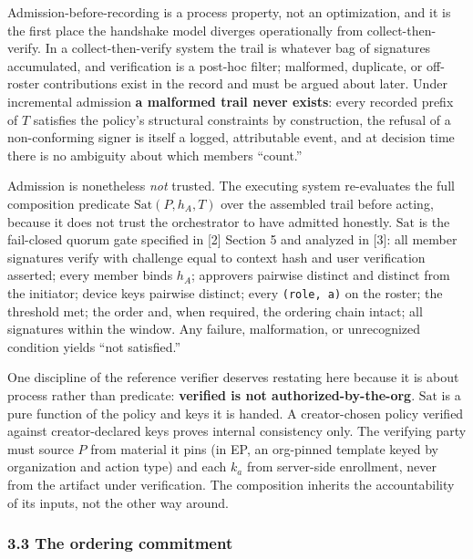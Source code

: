 \documentclass[
  11pt,
]{article}
\begin{document}
Admission-before-recording is a process property, not an optimization,
and it is the first place the handshake model diverges operationally
from collect-then-verify. In a collect-then-verify system the trail is
whatever bag of signatures accumulated, and verification is a post-hoc
filter; malformed, duplicate, or off-roster contributions exist in the
record and must be argued about later. Under incremental admission
\textbf{a malformed trail never exists}: every recorded prefix of $T$
satisfies the policy's structural constraints by construction, the
refusal of a non-conforming signer is itself a logged, attributable
event, and at decision time there is no ambiguity about which members
``count.''

Admission is nonetheless \emph{not} trusted. The executing system
re-evaluates the full composition predicate $\mathrm{Sat}(P, h_A, T)$
over the assembled trail before acting, because it does not trust the
orchestrator to have admitted honestly. $\mathrm{Sat}$ is the
fail-closed quorum gate specified in {[}2{]} Section 5 and analyzed in
{[}3{]}: all member signatures verify with challenge equal to context
hash and user verification asserted; every member binds $h_A$;
approvers pairwise distinct and distinct from the initiator; device keys
pairwise distinct; every \texttt{(role,\ a)} on the roster; the
threshold met; the order and, when required, the ordering chain intact;
all signatures within the window. Any failure, malformation, or
unrecognized condition yields ``not satisfied.''

One discipline of the reference verifier deserves restating here because
it is about process rather than predicate: \textbf{verified is not
authorized-by-the-org}. $\mathrm{Sat}$ is a pure function of the policy
and keys it is handed. A creator-chosen policy verified against
creator-declared keys proves internal consistency only. The verifying
party must source $P$ from material it pins (in EP, an org-pinned
template keyed by organization and action type) and each $k_a$ from
server-side enrollment, never from the artifact under verification. The
composition inherits the accountability of its inputs, not the other way
around.

\subsubsection{3.3 The ordering commitment}\label{the-ordering-commitment}
\end{document}
